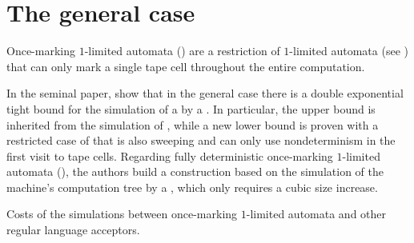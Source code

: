 \section{The general case}\label{sec:oncemarking-general}
Once-marking $1$-limited automata (\OMOLA) are a restriction of $1$-limited automata (see ) that can only mark a single tape cell throughout the entire computation.

In the seminal paper, \citeauthor{PigPri23a} show that in the general case there is a double exponential tight bound for the simulation of a \OMOLA by a \ODFA \cite{PigPri23a}.
In particular, the upper bound is inherited from the simulation of \OLA, while a new lower bound is proven with a restricted case of \OMOLA that is also sweeping and can only use nondeterminism in the first visit to tape cells.
Regarding fully deterministic once-marking $1$-limited automata (\OMODLA), the authors build a construction based on the simulation of the machine's computation tree by a \TDFA, which only requires a cubic size increase.

\begin{table}
	\centering
	\caption{Costs of the simulations between once-marking $1$-limited automata and other regular language acceptors.}
	\label{tab:sims-om-general-oncemarking}
\end{table}

